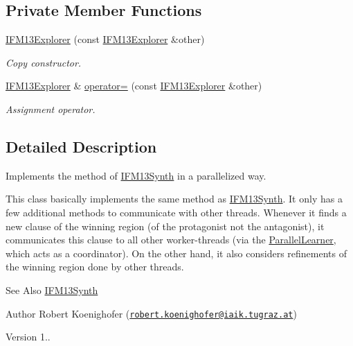 \subsection*{Private Member Functions}
\begin{DoxyCompactItemize}
\item 
\hyperlink{classIFM13Explorer_a72ffbbb782c795bd0391cda8a6418de5}{I\-F\-M13\-Explorer} (const \hyperlink{classIFM13Explorer}{I\-F\-M13\-Explorer} \&other)
\begin{DoxyCompactList}\small\item\em Copy constructor. \end{DoxyCompactList}\item 
\hyperlink{classIFM13Explorer}{I\-F\-M13\-Explorer} \& \hyperlink{classIFM13Explorer_ad8ae39cc2889577813138718f666aadf}{operator=} (const \hyperlink{classIFM13Explorer}{I\-F\-M13\-Explorer} \&other)
\begin{DoxyCompactList}\small\item\em Assignment operator. \end{DoxyCompactList}\end{DoxyCompactItemize}


\subsection{Detailed Description}
Implements the method of \hyperlink{classIFM13Synth}{I\-F\-M13\-Synth} in a parallelized way. 

This class basically implements the same method as \hyperlink{classIFM13Synth}{I\-F\-M13\-Synth}. It only has a few additional methods to communicate with other threads. Whenever it finds a new clause of the winning region (of the protagonist not the antagonist), it communicates this clause to all other worker-\/threads (via the \hyperlink{classParallelLearner}{Parallel\-Learner}, which acts as a coordinator). On the other hand, it also considers refinements of the winning region done by other threads.

\begin{DoxySeeAlso}{See Also}
\hyperlink{classIFM13Synth}{I\-F\-M13\-Synth}
\end{DoxySeeAlso}
\begin{DoxyAuthor}{Author}
Robert Koenighofer (\href{mailto:robert.koenighofer@iaik.tugraz.at}{\tt robert.\-koenighofer@iaik.\-tugraz.\-at}) 
\end{DoxyAuthor}
\begin{DoxyVersion}{Version}
1.. 
\end{DoxyVersion}


